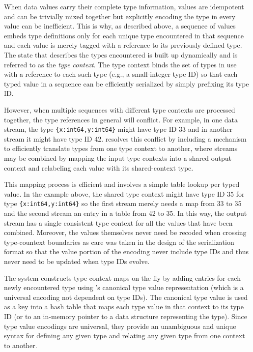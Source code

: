 When data values carry their complete type information, values are idempotent and can be trivially mixed together but explicitly encoding the type in every value can be inefficient.  This is why, as described above, a sequence of \sys{} values embeds type definitions only for each unique type encountered in that sequence and each value is merely tagged with a reference to its previously defined type.  The state that describes the types encountered is built up dynamically and is referred to as the {\em type context}.  The type context binds the set of types in use with a reference to each such type (e.g., a small-integer type ID) so that each typed value in a sequence can be efficiently serialized by simply prefixing its type ID.

However, when multiple sequences with different type contexts are processed together, the type references in general will conflict.  For example, in one data stream, the type \texttt{\{x:int64,y:int64\}} might have type ID 33 and in another stream it might have type ID 42.  \sys{} resolves this conflict by including a mechanism to efficiently translate types from one type context to another, where streams may be combined by mapping the input type contexts into a shared output context and relabeling each value with its shared-context type.

This mapping process is efficient and involves a simple table lookup per typed value.  In the example above, the shared type context might have type ID 35 for type \texttt{\{x:int64,y:int64\}} so the first stream merely needs a map from 33 to 35 and the second stream an entry in a table from 42 to 35.  In this way, the output stream has a single consistent type context for all the values that have been combined.  Moreover, the values themselves never need be recoded when crossing type-countext boundaries as care was taken in the design of the serialization format so that the value portion of the encoding never include type IDs and thus never need to be updated when type IDs evolve.

The \sys{} system constructs type-context maps on the fly by adding entries for each newly encountered type using \zed{}'s canonical type value representation (which is a universal encoding not dependent on type IDs).  The canonical type value is used as a key into a hash table that maps each type value in that context to its type ID (or to an in-memory pointer to a data structure representing the type).  Since type value encodings are universal, they provide an unambiguous and unique syntax for defining any given type and relating any given type from one context to another.

